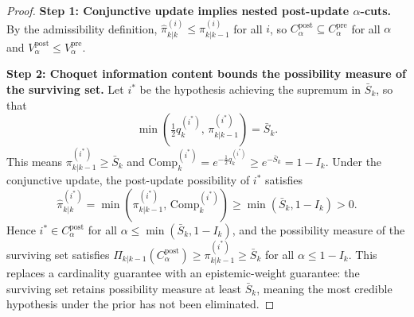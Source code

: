 \documentclass[12pt]{article}
\begin{document}
\begin{proof}
\textbf{Step 1: Conjunctive update implies nested post-update $\alpha$-cuts.} By the admissibility definition, $\hat{\pi}^{(i)}_{k|k} \leq \pi^{(i)}_{k|k-1}$ for all $i$, so $C^\mathrm{post}_\alpha \subseteq C^\mathrm{pre}_\alpha$ for all $\alpha$ and $V^\mathrm{post}_\alpha \leq V^\mathrm{pre}_\alpha$.

\textbf{Step 2: Choquet information content bounds the possibility measure of the surviving set.} Let $i^*$ be the hypothesis achieving the supremum in $\bar{S}_k$, so that
\[
\min\!\left(\tfrac{1}{2}q^{(i^*)}_k,\, \pi^{(i^*)}_{k|k-1}\right) = \bar{S}_k.
\]
This means $\pi^{(i^*)}_{k|k-1} \geq \bar{S}_k$ and $\mathrm{Comp}^{(i^*)}_k = e^{-\frac{1}{2}q^{(i^*)}_k} \geq e^{-\bar{S}_k} = 1 - I_k$. Under the conjunctive update, the post-update possibility of $i^*$ satisfies
\[
\hat{\pi}^{(i^*)}_{k|k} = \min\!\left(\pi^{(i^*)}_{k|k-1},\, \mathrm{Comp}^{(i^*)}_k\right) \geq \min(\bar{S}_k, 1-I_k) > 0.
\]
Hence $i^* \in C^\mathrm{post}_\alpha$ for all $\alpha \leq \min(\bar{S}_k, 1-I_k)$, and the possibility measure of the surviving set satisfies $\Pi_{k|k-1}(C^\mathrm{post}_\alpha) \geq \pi^{(i^*)}_{k|k-1} \geq \bar{S}_k$ for all $\alpha \leq 1-I_k$. This replaces a cardinality guarantee with an epistemic-weight guarantee: the surviving set retains possibility measure at least $\bar{S}_k$, meaning the most credible hypothesis under the prior has not been eliminated.


\end{proof}
\end{document}

